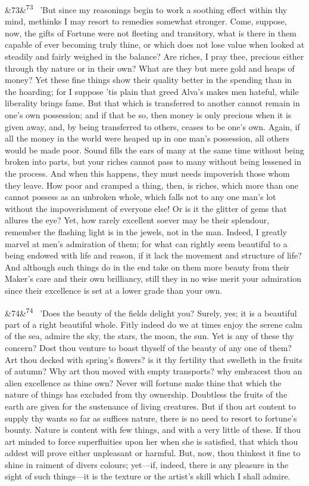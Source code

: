 \documentclass[12pt]{article}
\newcommand{\para}[1][]{\par\noindent\ifx&#1&\else\textsuperscript{\footnotesize #1}~\fi}
\begin{document}
\para[73] 'But since my reasonings begin to work a soothing effect within thy mind, methinks I may resort to remedies somewhat stronger. Come, suppose, now, the gifts of Fortune were not fleeting and transitory, what is there in them capable of ever becoming truly thine, or which does not lose value when looked at steadily and fairly weighed in the balance? Are riches, I pray thee, precious either through thy nature or in their own? What are they but mere gold and heaps of money? Yet these fine things show their quality better in the spending than in the hoarding; for I suppose 'tis plain that greed Alva's makes men hateful, while liberality brings fame. But that which is transferred to another cannot remain in one's own possession; and if that be so, then money is only precious when it is given away, and, by being transferred to others, ceases to be one's own. Again, if all the money in the world were heaped up in one man's possession, all others would be made poor. Sound fills the ears of many at the same time without being broken into parts, but your riches cannot pass to many without being lessened in the process. And when this happens, they must needs impoverish those whom they leave. How poor and cramped a thing, then, is riches, which more than one cannot possess as an unbroken whole, which falls not to any one man's lot without the impoverishment of everyone else! Or is it the glitter of gems that allures the eye? Yet, how rarely excellent soever may be their splendour, remember the flashing light is in the jewels, not in the man. Indeed, I greatly marvel at men's admiration of them; for what can rightly seem beautiful to a being endowed with life and reason, if it lack the movement and structure of life? And although such things do in the end take on them more beauty from their Maker's care and their own brilliancy, still they in no wise merit your admiration since their excellence is set at a lower grade than your own.

\para[74] 'Does the beauty of the fields delight you? Surely, yes; it is a beautiful part of a right beautiful whole. Fitly indeed do we at times enjoy the serene calm of the sea, admire the sky, the stars, the moon, the sun. Yet is any of these thy concern? Dost thou venture to boast thyself of the beauty of any one of them? Art thou decked with spring's flowers? is it thy fertility that swelleth in the fruits of autumn? Why art thou moved with empty transports? why embracest thou an alien excellence as thine own? Never will fortune make thine that which the nature of things has excluded from thy ownership. Doubtless the fruits of the earth are given for the sustenance of living creatures. But if thou art content to supply thy wants so far as suffices nature, there is no need to resort to fortune's bounty. Nature is content with few things, and with a very little of these. If thou art minded to force superfluities upon her when she is satisfied, that which thou addest will prove either unpleasant or harmful. But, now, thou thinkest it fine to shine in raiment of divers colours; yet---if, indeed, there is any pleasure in the sight of such things---it is the texture or the artist's skill which I shall admire.
\end{document}
